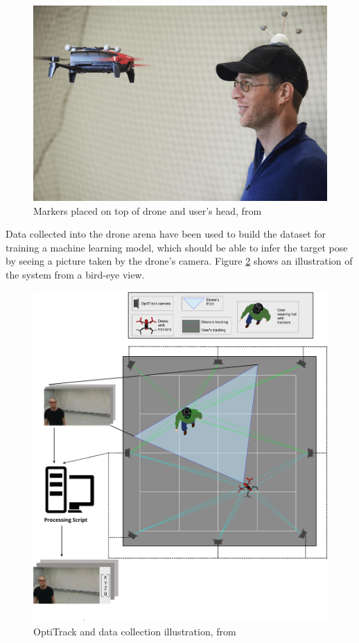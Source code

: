 \begin{figure}[!h]
	\centering
	\includegraphics[width=1\textwidth]{"contents/images/03-drone-facing"}
	\caption[Markers placed on top of drone and user's head]{Markers placed on top of drone and user's head, from \cite{mantegazza2018thesis}}
	\label{fig:drone-facing}
\end{figure}

Data collected into the drone arena have been used to build the dataset for training a machine learning model, which should be able to infer the target pose by seeing a picture taken by the drone's camera. Figure \ref{fig:drone-demo-2} shows an illustration of the system from a bird-eye view.

\begin{figure}[!htb]
	\centering
	\includegraphics[width=1\textwidth]{"contents/images/03-arena-demo-2"}
	\caption[OptiTrack and data collection illustration]{OptiTrack and data collection illustration, from \cite{mantegazza2018thesis}}
	\label{fig:drone-demo-2}
\end{figure}




